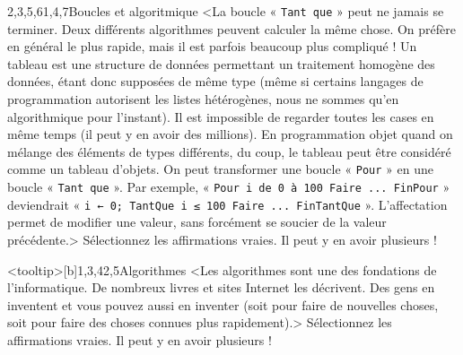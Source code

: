 \begin{quiz}[title={Instructions élémentaires}]
\begin{quizquestion}[c]{2,3,5,6}{1,4,7}{Boucles et algoritmique}
<La boucle « \texttt{Tant que} » peut ne jamais se terminer.
Deux différents algorithmes peuvent calculer la même chose. On préfère en général le plus rapide, mais il est parfois beaucoup plus compliqué !
Un tableau est une structure de données permettant un traitement homogène des données, étant donc supposées de même type (même si certains langages de programmation autorisent les listes hétérogènes, nous ne sommes qu'en algorithmique pour l'instant). Il est impossible de regarder toutes les cases en même temps (il peut y en avoir des millions). En programmation objet quand on mélange des éléments de types différents, du coup, le tableau peut être considéré comme un tableau d'objets.
On peut transformer une boucle « \texttt{Pour} » en une boucle « \texttt{Tant que} ». Par exemple,
« \texttt{Pour i de 0 à 100 Faire ... FinPour} » deviendrait « \texttt{i ← 0; TantQue i ≤ 100 Faire ... FinTantQue} ».
L'affectation permet de modifier une valeur, sans forcément se soucier de la valeur précédente.>
Sélectionnez les affirmations vraies. Il peut y en avoir plusieurs !
\end{quizquestion}
\end{quiz}

\begin{quiz}[title={Culture algoritmique}]
\begin{quizquestion}<tooltip>[b]{1,3,4}{2,5}{Algorithmes}
<Les algorithmes sont une des fondations de l'informatique. De nombreux livres et sites Internet les décrivent. Des gens en inventent et vous pouvez aussi en inventer (soit pour faire de nouvelles choses, soit pour faire des choses connues plus rapidement).>
Sélectionnez les affirmations vraies. Il peut y en avoir plusieurs !
\end{quizquestion}
\end{quiz}

